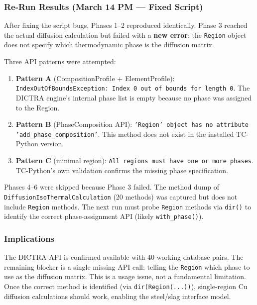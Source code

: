 \documentclass[11pt]{article}
\begin{document}
\subsubsection{Re-Run Results (March 14 PM --- Fixed Script)}

After fixing the script bugs, Phases 1--2 reproduced identically. Phase 3 reached the actual diffusion calculation but failed with a \textbf{new error}: the \texttt{Region} object does not specify which thermodynamic phase is the diffusion matrix.

Three API patterns were attempted:
\begin{enumerate}[leftmargin=*]
    \item \textbf{Pattern A} (CompositionProfile + ElementProfile): \texttt{IndexOutOfBoundsException: Index 0 out of bounds for length 0}. The DICTRA engine's internal phase list is empty because no phase was assigned to the Region.
    \item \textbf{Pattern B} (PhaseComposition API): \texttt{'Region' object has no attribute 'add\_phase\_composition'}. This method does not exist in the installed TC-Python version.
    \item \textbf{Pattern C} (minimal region): \texttt{All regions must have one or more phases}. TC-Python's own validation confirms the missing phase specification.
\end{enumerate}

Phases 4--6 were skipped because Phase 3 failed. The method dump of \texttt{DiffusionIsoThermalCalculation} (20 methods) was captured but does not include \texttt{Region} methods. The next run must probe \texttt{Region} methods via \texttt{dir()} to identify the correct phase-assignment API (likely \texttt{with\_phase()}).

\subsubsection{Implications}

The DICTRA API is confirmed available with 40 working database pairs. The remaining blocker is a single missing API call: telling the \texttt{Region} which phase to use as the diffusion matrix. This is a usage issue, not a fundamental limitation. Once the correct method is identified (via \texttt{dir(Region(...))}), single-region Cu diffusion calculations should work, enabling the steel/slag interface model.


\end{document}
